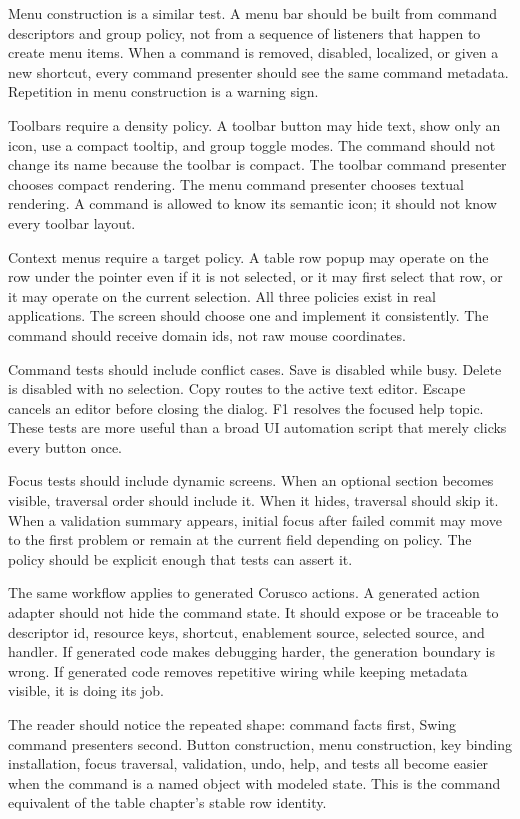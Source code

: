Menu construction is a similar test. A menu bar should be built from command descriptors and group policy, not from a sequence of listeners that happen to create menu items. When a command is removed, disabled, localized, or given a new shortcut, every command presenter should see the same command metadata. Repetition in menu construction is a warning sign.

Toolbars require a density policy. A toolbar button may hide text, show only an icon, use a compact tooltip, and group toggle modes. The command should not change its name because the toolbar is compact. The toolbar command presenter chooses compact rendering. The menu command presenter chooses textual rendering. A command is allowed to know its semantic icon; it should not know every toolbar layout.

Context menus require a target policy. A table row popup may operate on the row under the pointer even if it is not selected, or it may first select that row, or it may operate on the current selection. All three policies exist in real applications. The screen should choose one and implement it consistently. The command should receive domain ids, not raw mouse coordinates.

Command tests should include conflict cases. Save is disabled while busy. Delete is disabled with no selection. Copy routes to the active text editor. Escape cancels an editor before closing the dialog. F1 resolves the focused help topic. These tests are more useful than a broad UI automation script that merely clicks every button once.

Focus tests should include dynamic screens. When an optional section becomes visible, traversal order should include it. When it hides, traversal should skip it. When a validation summary appears, initial focus after failed commit may move to the first problem or remain at the current field depending on policy. The policy should be explicit enough that tests can assert it.

The same workflow applies to generated Corusco actions. A generated action adapter should not hide the command state. It should expose or be traceable to descriptor id, resource keys, shortcut, enablement source, selected source, and handler. If generated code makes debugging harder, the generation boundary is wrong. If generated code removes repetitive wiring while keeping metadata visible, it is doing its job.

The reader should notice the repeated shape: command facts first, Swing command presenters second. Button construction, menu construction, key binding installation, focus traversal, validation, undo, help, and tests all become easier when the command is a named object with modeled state. This is the command equivalent of the table chapter's stable row identity.

